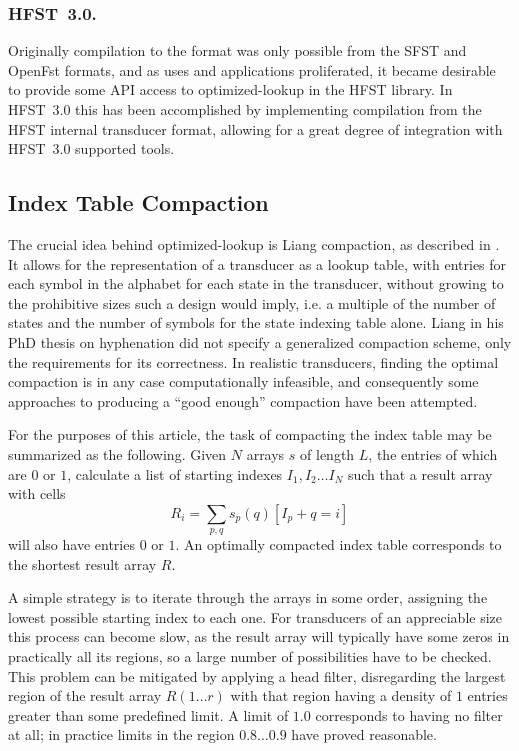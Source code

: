 \documentclass{llncs}
\begin{document}
\subsubsection{HFST~3.0.}
Originally compilation to the format was only possible from the SFST and OpenFst
formats, and as uses and applications proliferated, it became desirable to
provide some API access to optimized-lookup in the HFST library. In HFST~3.0
this has been accomplished by implementing compilation from the HFST internal
transducer format, allowing for a great degree of integration with
HFST~3.0 supported tools.

\subsection{Index Table Compaction}
The crucial idea behind optimized-lookup is Liang compaction, as described in
\cite{silfverberg/2009}. It allows for the representation of a transducer as
a lookup table, with entries for each symbol in the alphabet for each state
in the transducer, without growing to the prohibitive sizes such a design
would imply, i.e. a multiple of the number of states and the number of symbols for
the state indexing table alone. Liang in his PhD thesis on hyphenation
\cite{liang/1983} did not specify a generalized compaction scheme, only the
requirements for its correctness. In realistic transducers, finding the optimal
compaction is in any case computationally infeasible, and consequently some approaches to
producing a ``good enough'' compaction have been attempted.

For the purposes of this article, the task of compacting the index table may
be summarized as the following. Given $N$ arrays $s$ of length $L$, the
entries of which are $0$ or $1$, calculate a list of starting indexes
$I_1, I_2 \ldots I_N$ such that a result array with cells
\begin{equation}
R_i = \displaystyle\sum\limits_{p, q} s_p(q) [I_p + q = i]
\end{equation} will also have
entries $0$ or $1$. An optimally compacted index table corresponds to the
shortest result array $R$.

A simple strategy is to iterate through the arrays in some order, assigning
the lowest possible starting index to each one. For transducers of an
appreciable size this process can become slow, as the result array
will typically have some zeros in practically all its regions, so a large
number of possibilities have to be checked. This problem can be mitigated by
applying a head filter, disregarding the largest region of the result array
$R(1 \ldots r)$ with that region having a density of $1$ entries greater than
some predefined limit. A limit of $1.0$ corresponds to having no filter at all;
in practice limits in the region $0.8 \ldots 0.9$ have proved reasonable.
\end{document}
